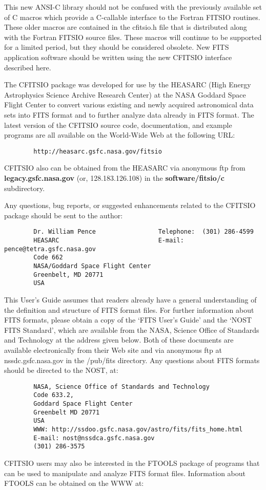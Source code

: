 This new ANSI-C library should not be confused with the previously
available set of C macros which provide a C-callable interface to the
Fortran FITSIO routines.  These older macros are contained in the
cfitsio.h file that is distributed along with the Fortran FITSIO source
files.  These macros will continue to be supported for a limited
period, but they should be considered obsolete.  New FITS application
software should be written using the new CFITSIO interface described
here.

The CFITSIO package was developed for use by the HEASARC (High Energy
Astrophysics Science Archive Research Center) at the NASA Goddard Space
Flight Center to convert various existing and newly acquired
astronomical data sets into FITS format and to further analyze data
already in FITS format.  The latest version of the CFITSIO source code,
documentation, and example programs are all available on the World-Wide
Web at the following URL:

\begin{verbatim}
        http://heasarc.gsfc.nasa.gov/fitsio
\end{verbatim}
CFITSIO also can be obtained from the HEASARC via anonymous ftp from
{\bf legacy.gsfc.nasa.gov}    (or, 128.183.126.108) in the
{\bf software/fitsio/c} subdirectory.

Any questions, bug reports, or suggested enhancements related to the CFITSIO
package should be sent to the author:

\begin{verbatim}
        Dr. William Pence                 Telephone:  (301) 286-4599
        HEASARC                           E-mail: pence@tetra.gsfc.nasa.gov
        Code 662
        NASA/Goddard Space Flight Center
        Greenbelt, MD 20771
        USA
\end{verbatim}
This User's Guide assumes that readers already have a general
understanding of the definition and structure of FITS format files.
For further information about FITS formats, please obtain a copy of the
`FITS User's Guide' and the `NOST FITS Standard', which are available
from the NASA, Science Office of Standards and Technology at the
address given below.  Both of these documents are available
electronically from their Web site and via anonymous ftp at
nssdc.gsfc.nasa.gov in the /pub/fits directory. Any questions about
FITS formats should be directed to the NOST, at:

\begin{verbatim}
        NASA, Science Office of Standards and Technology
        Code 633.2,
        Goddard Space Flight Center
        Greenbelt MD 20771
        USA
        WWW: http://ssdoo.gsfc.nasa.gov/astro/fits/fits_home.html
        E-mail: nost@nssdca.gsfc.nasa.gov
        (301) 286-3575
\end{verbatim}
CFITSIO users may also be interested in the FTOOLS package of programs
that can be used to manipulate and analyze FITS format files.
Information about FTOOLS can be obtained on the WWW at:

